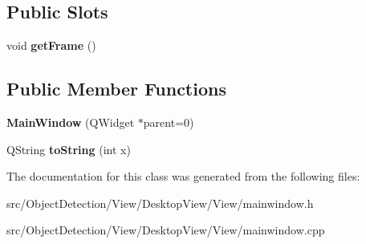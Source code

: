 \subsection*{Public Slots}
\begin{DoxyCompactItemize}
\item 
\mbox{\label{class_main_window_a3fdb5e558e83b1e3b45d73544c2488a3}} 
void {\bfseries get\+Frame} ()
\end{DoxyCompactItemize}
\subsection*{Public Member Functions}
\begin{DoxyCompactItemize}
\item 
\mbox{\label{class_main_window_a8b244be8b7b7db1b08de2a2acb9409db}} 
{\bfseries Main\+Window} (Q\+Widget $\ast$parent=0)
\item 
\mbox{\label{class_main_window_a2b4d41b838e4fb53f4fdf4951cc69db4}} 
Q\+String {\bfseries to\+String} (int x)
\end{DoxyCompactItemize}


The documentation for this class was generated from the following files\+:\begin{DoxyCompactItemize}
\item 
src/\+Object\+Detection/\+View/\+Desktop\+View/\+View/mainwindow.\+h\item 
src/\+Object\+Detection/\+View/\+Desktop\+View/\+View/mainwindow.\+cpp\end{DoxyCompactItemize}
